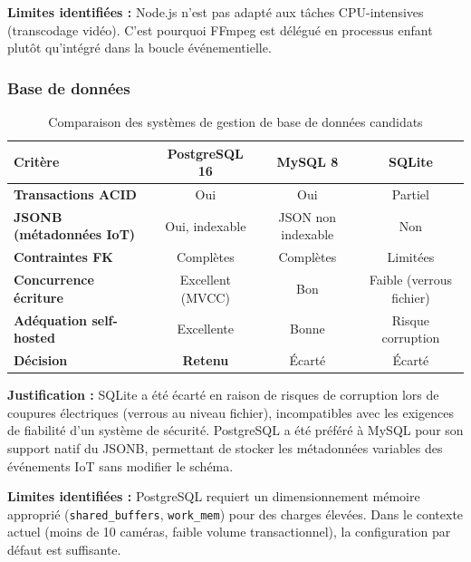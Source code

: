 \documentclass[12pt,a4paper]{article}
\begin{document}
\begin{warnbox}
\textbf{Limites identifiées :} Node.js n'est pas adapté aux tâches CPU-intensives (transcodage vidéo). C'est pourquoi FFmpeg est délégué en processus enfant plutôt qu'intégré dans la boucle événementielle.
\end{warnbox}


\subsubsection{Base de données}

\begin{table}[H]
\centering
\small
\renewcommand{\arraystretch}{1.3}
\begin{tabular}{|l|c|c|c|}
\hline
\textbf{Critère} & \textbf{PostgreSQL 16} & \textbf{MySQL 8} & \textbf{SQLite} \\
\hline
\textbf{Transactions ACID} & Oui & Oui & Partiel \\
\hline
\textbf{JSONB (métadonnées IoT)} & Oui, indexable & JSON non indexable & Non \\
\hline
\textbf{Contraintes FK} & Complètes & Complètes & Limitées \\
\hline
\textbf{Concurrence écriture} & Excellent (MVCC) & Bon & Faible (verrous fichier) \\
\hline
\textbf{Adéquation self-hosted} & Excellente & Bonne & Risque corruption \\
\hline
\textbf{Décision} & \textcolor{green!60!black}{\textbf{Retenu}} & Écarté & Écarté \\
\hline
\end{tabular}
\caption{Comparaison des systèmes de gestion de base de données candidats}
\end{table}

\begin{infobox}
\textbf{Justification :} SQLite a été écarté en raison de risques de corruption lors de coupures électriques (verrous au niveau fichier), incompatibles avec les exigences de fiabilité d'un système de sécurité. PostgreSQL a été préféré à MySQL pour son support natif du JSONB, permettant de stocker les métadonnées variables des événements IoT sans modifier le schéma.
\end{infobox}

\begin{warnbox}
\textbf{Limites identifiées :} PostgreSQL requiert un dimensionnement mémoire approprié (\texttt{shared\_buffers}, \texttt{work\_mem}) pour des charges élevées. Dans le contexte actuel (moins de 10 caméras, faible volume transactionnel), la configuration par défaut est suffisante.
\end{warnbox}
\end{document}

